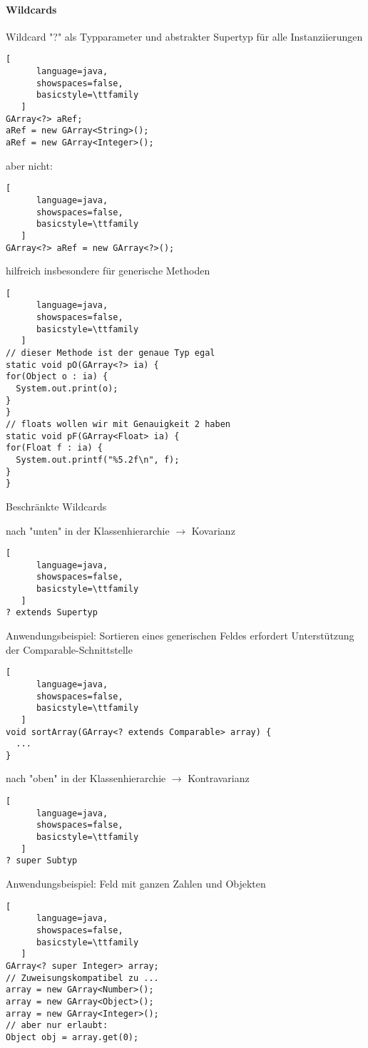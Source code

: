 \documentclass[10pt]{article}
\begin{document}
\paragraph{Wildcards}
Wildcard "?" als Typparameter und abstrakter Supertyp für alle Instanziierungen
\begin{lstlisting}[
      language=java,
      showspaces=false,
      basicstyle=\ttfamily
   ]
GArray<?> aRef;
aRef = new GArray<String>();
aRef = new GArray<Integer>();
\end{lstlisting}

aber nicht:
\begin{lstlisting}[
      language=java,
      showspaces=false,
      basicstyle=\ttfamily
   ]
GArray<?> aRef = new GArray<?>();
\end{lstlisting}

hilfreich insbesondere für generische Methoden
\begin{lstlisting}[
      language=java,
      showspaces=false,
      basicstyle=\ttfamily
   ]
// dieser Methode ist der genaue Typ egal
static void pO(GArray<?> ia) {
for(Object o : ia) {
  System.out.print(o);
}
}
// floats wollen wir mit Genauigkeit 2 haben
static void pF(GArray<Float> ia) {
for(Float f : ia) {
  System.out.printf("%5.2f\n", f);
}
}
\end{lstlisting}


Beschränkte Wildcards 
\begin{itemize*}
  \item nach "unten" in der Klassenhierarchie $\rightarrow$ Kovarianz
  \begin{lstlisting}[
      language=java,
      showspaces=false,
      basicstyle=\ttfamily
   ] 
? extends Supertyp 
\end{lstlisting}
  
  Anwendungsbeispiel: Sortieren eines generischen Feldes erfordert Unterstützung der Comparable-Schnittstelle
  \begin{lstlisting}[
      language=java,
      showspaces=false,
      basicstyle=\ttfamily
   ]
void sortArray(GArray<? extends Comparable> array) {
  ...
}
\end{lstlisting}
  
  \item nach "oben" in der Klassenhierarchie $\rightarrow$ Kontravarianz
  \begin{lstlisting}[
      language=java,
      showspaces=false,
      basicstyle=\ttfamily
   ]
? super Subtyp
\end{lstlisting}
  
  Anwendungsbeispiel: Feld mit ganzen Zahlen und Objekten
  \begin{lstlisting}[
      language=java,
      showspaces=false,
      basicstyle=\ttfamily
   ]
GArray<? super Integer> array;
// Zuweisungskompatibel zu ...
array = new GArray<Number>();
array = new GArray<Object>();
array = new GArray<Integer>();
// aber nur erlaubt:
Object obj = array.get(0);
\end{lstlisting}
  
\end{itemize*}
\end{document}
